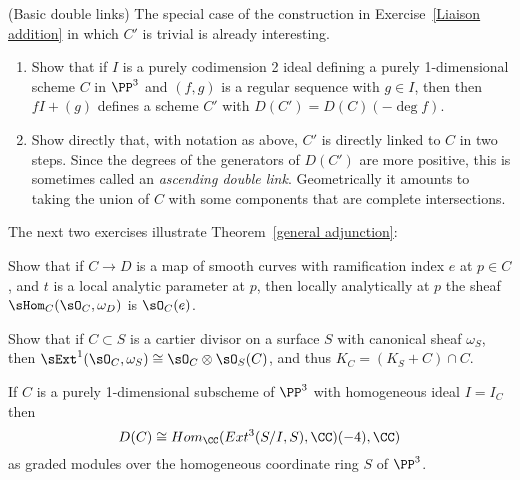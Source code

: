 \begin{exercise}(Basic double links)\label{Basic double links}
The special case of the construction in Exercise~\ref{Liaison addition} in which $C'$ is trivial is already interesting. 

\begin{enumerate}
 \item Show that if $I$ is a purely codimension 2 ideal
 defining a purely 1-dimensional scheme $C$ in $\PP^3$
 and $(f, g)$ is a regular sequence with $g\in I$, then
 then  $fI+(g)$ defines a scheme $C'$ with $D(C') = D(C)(-\deg f)$.

 \item Show directly that, with notation as above, $C'$ is directly linked to $C$
 in two steps.  Since the degrees of the generators of $D(C')$ are more positive, this
 is sometimes called an \emph{ascending double link}. Geometrically it amounts to taking the
 union of $C$ with some  components that are complete intersections.
 \end{enumerate}

\end{exercise}

The next two exercises illustrate Theorem~\ref{general adjunction}:

\begin{exercise}\label{codimension0}
Show that if $C\to D$ is a map of smooth curves with ramification index $e$ at $p\in C$, and $t$ is a local
analytic parameter at $p$, then 
locally analytically at $p$ the sheaf $\sHom_C(\sO_C, \omega_D)$ is $\sO_C(e)$.
\end{exercise}

\begin{exercise}\label{codimension1}
 Show that if $C\subset S$ is a cartier divisor on a surface $S$ with canonical sheaf $\omega_S$, 
 then $\sExt^1(\sO_C, \omega_S) \cong \sO_C\otimes \sO_S(C)$, and thus $K_C = (K_S+C)\cap C$.
\end{exercise}



\begin{corollary}
If $C$ is a purely 1-dimensional subscheme of $\PP^3$ with homogeneous ideal $I = I_C$ then 
$$
D(C) \cong Hom_\CC (Ext^3(S/I, S), \CC)(-4), \CC)
$$
as graded modules over the homogeneous coordinate ring $S$ of $\PP^3$.
\end{corollary}

